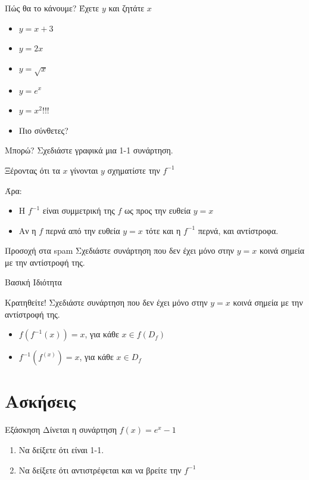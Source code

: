 \documentclass[greek]{beamer}
\begin{document}
\begin{frame}{Πώς θα το κάνουμε?}
 Έχετε $y$ και ζητάτε $x$ \pause
 \begin{itemize}
  \item $y=x+3$ \pause
  \item $y=2x$ \pause
  \item $y=\sqrt{x}$ \pause
  \item $y=e^x$ \pause
  \item $y=x^2$!!! \pause
  \item Πιο σύνθετες?
 \end{itemize}
\end{frame}

\begin{frame}{Μπορώ?}
 Σχεδιάστε γραφικά μια 1-1 συνάρτηση. \pause

 Ξέροντας ότι τα $x$ γίνονται $y$ σχηματίστε την $f^{-1}$ \pause

 Άρα:
 \begin{itemize}
  \item Η $f^{-1}$ είναι συμμετρική της $f$ ως προς την ευθεία $y=x$ \pause
  \item Αν η $f$ περνά από την ευθεία $y=x$ τότε και η $f^{-1}$ περνά, και αντίστροφα.
 \end{itemize} \pause
 \begin{alertblock}{Προσοχή στα spam}
  Σχεδιάστε συνάρτηση που δεν έχει μόνο στην $y=x$ κοινά σημεία με την αντίστροφή της.
 \end{alertblock}
\end{frame}

\begin{frame}{Βασική Ιδιότητα}
 \begin{exampleblock}{Κρατηθείτε!}
  Σχεδιάστε συνάρτηση που δεν έχει μόνο στην $y=x$ κοινά σημεία με την αντίστροφή της.
  \begin{itemize}
   \item $f\left(f^{-1}(x)\right)=x$, για κάθε $x\in f(D_f)$ \pause
   \item $f^{-1}\left(f^(x)\right)=x$, για κάθε $x\in D_f$
  \end{itemize}
 \end{exampleblock}
\end{frame}

\section{Ασκήσεις}
\begin{frame}{Εξάσκηση}
 Δίνεται η συνάρτηση $f(x)=e^x-1$
 \begin{enumerate}
  \item Να δείξετε ότι είναι 1-1. \pause
  \item Να δείξετε ότι αντιστρέφεται και να βρείτε την $f^{-1}$
 \end{enumerate}
\end{frame}
\end{document}
